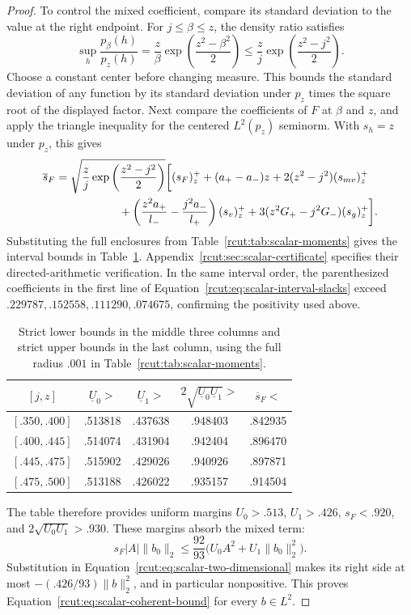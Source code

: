 \begin{proof}
To control the mixed coefficient, compare its standard deviation to
the value at the right endpoint. For \(j\leq\beta\leq z\), the
density ratio satisfies
\[
 \sup_h\frac{p_\beta(h)}{p_z(h)}
 =\frac z\beta\exp\left(\frac{z^2-\beta^2}{2}\right)
 \leq\frac zj\exp\left(\frac{z^2-j^2}{2}\right).
\]
Choose a constant center before changing measure. This bounds the
standard deviation of any function by its standard deviation under
\(p_z\) times the square root of the displayed factor. Next compare
the coefficients of \(F\) at \(\beta\) and \(z\), and apply the
triangle inequality for the centered \(L^2(p_z)\) seminorm. With
\(s_h=z\) under \(p_z\), this gives
\begin{equation}
 \begin{split}
 \overline s_F={}&
 \sqrt{\frac zj\exp\left(\frac{z^2-j^2}{2}\right)}
 \biggl[(s_F)_z^++(a_+-a_-)z
       +2(z^2-j^2)(s_{mv})_z^+\\
 &\hspace{15mm}
       +\left(\frac{z^2a_+}{l_-}-\frac{j^2a_-}{l_+}\right)(s_v)_z^+
       +3(z^2G_+-j^2G_-)(s_g)_z^+\biggr].
 \end{split}
 \label{rcut:eq:scalar-interval-cross}
\end{equation}
Substituting the full enclosures from
Table~\ref{rcut:tab:scalar-moments} gives the interval bounds in
Table~\ref{rcut:tab:scalar-intervals}. Appendix~\ref{rcut:sec:scalar-certificate}
specifies their directed-arithmetic verification. In the same interval
order, the parenthesized coefficients in the first line of
Equation~\eqref{rcut:eq:scalar-interval-slacks} exceed
\(.229787,.152558,.111290,.074675\), confirming the positivity used
above.

\begin{table}[htbp]
 \centering
 \caption{Strict lower bounds in the middle three columns and strict
 upper bounds in the last column, using the full radius \(.001\)
 in Table~\ref{rcut:tab:scalar-moments}.}
 \label{rcut:tab:scalar-intervals}
 \begin{tabular}{ccccc}
 \toprule
 \([j,z]\)&\(\underline U_0>\)&\(\underline U_1>\)&
 \(2\sqrt{\underline U_0\underline U_1}>\)&\(\overline s_F<\)\\
 \midrule
 \([.350,.400]\)&.513818&.437638&.948403&.842935\\
 \([.400,.445]\)&.514074&.431904&.942404&.896470\\
 \([.445,.475]\)&.515902&.429026&.940926&.897871\\
 \([.475,.500]\)&.513188&.426022&.935157&.914504\\
 \bottomrule
 \end{tabular}
\end{table}

The table therefore provides uniform margins
\(U_0>.513\), \(U_1>.426\), \(s_F<.920\), and
\(2\sqrt{U_0U_1}>.930\). These margins absorb the mixed term:
\[
 s_F|A|\|b_0\|_2
 \leq\frac{92}{93}\bigl(U_0A^2+U_1\|b_0\|_2^2\bigr).
\]
Substitution in Equation~\eqref{rcut:eq:scalar-two-dimensional} makes
its right side at most \(-(.426/93)\|b\|_2^2\), and in particular
nonpositive. This proves Equation~\eqref{rcut:eq:scalar-coherent-bound}
for every \(b\in L^2\).
\end{proof}

